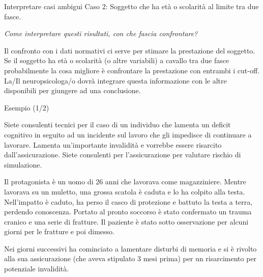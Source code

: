 \documentclass[
  ignorenonframetext,
  aspectratio=169,
]{beamer}
\begin{document}
\begin{frame}{Interpretare casi ambigui}
\label{interpretare-casi-ambigui-1}
Caso 2: Soggetto che ha età o scolarità al limite tra due fasce.

\emph{Come interpretare questi risultati, con che fascia confrontare?}

Il confronto con i dati normativi ci serve per stimare la prestazione
del soggetto. Se il soggetto ha età o scolarità (o altre variabili) a
cavallo tra due fasce probabilmente la cosa migliore è confrontare la
prestazione con entrambi i cut-off. La/Il neuropsicologa/o dovrà
integrare questa informazione con le altre disponibili per giungere ad
una conclusione.
\end{frame}

\begin{frame}{Esempio (1/2)}
\label{esempio-12}
\scriptsize

Siete consulenti tecnici per il caso di un individuo che lamenta un
deficit cognitivo in seguito ad un incidente sul lavoro che gli
impedisce di continuare a lavorare. Lamenta un'importante invalidità e
vorrebbe essere risarcito dall'assicurazione. Siete consulenti per
l'assicurazione per valutare rischio di simulazione.

Il protagonista è un uomo di 26 anni che lavorava come magazziniere.
Mentre lavorava su un muletto, una grossa scatola è caduta e lo ha
colpito alla testa. Nell'impatto è caduto, ha perso il casco di
protezione e battuto la testa a terra, perdendo conoscenza. Portato al
pronto soccorso è stato confermato un trauma cranico e una serie di
fratture. Il paziente è stato sotto osservazione per alcuni giorni per
le fratture e poi dimesso.

Nei giorni successivi ha cominciato a lamentare disturbi di memoria e si
è rivolto alla sua assicurazione (che aveva stipulato 3 mesi prima) per
un risarcimento per potenziale invalidità.
\end{frame}
\end{document}
